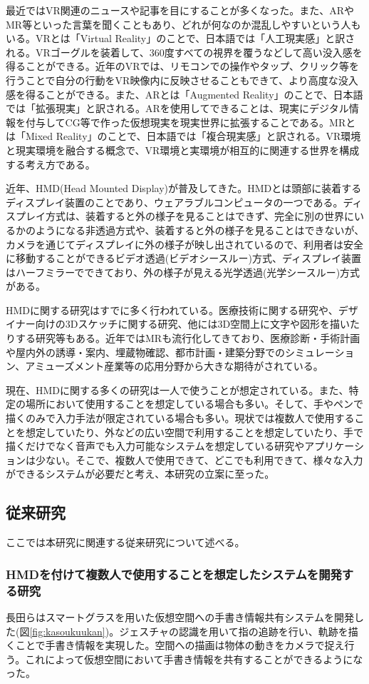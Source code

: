 \documentclass[11pt,a4j, titlepage]{jarticle} %
\begin{document}
最近ではVR関連のニュースや記事を目にすることが多くなった。また、ARやMR等といった言葉を聞くこともあり、どれが何なのか混乱しやすいという人もいる。VRとは「Virtual Reality」のことで、日本語では「人工現実感」と訳される。VRゴーグルを装着して、360度すべての視界を覆うなどして高い没入感を得ることができる。近年のVRでは、リモコンでの操作やタップ、クリック等を行うことで自分の行動をVR映像内に反映させることもできて、より高度な没入感を得ることができる。また、ARとは「Augmented Reality」のことで、日本語では「拡張現実」と訳される。ARを使用してできることは、現実にデジタル情報を付与してCG等で作った仮想現実を現実世界に拡張することである。MRとは「Mixed Reality」のことで、日本語では「複合現実感」と訳される。VR環境と現実環境を融合する概念で、VR環境と実環境が相互的に関連する世界を構成する考え方である。

近年、HMD(Head Mounted Display)が普及してきた。HMDとは頭部に装着するディスプレイ装置のことであり、ウェアラブルコンピュータの一つである。ディスプレイ方式は、装着すると外の様子を見ることはできず、完全に別の世界にいるかのようになる非透過方式や、装着すると外の様子を見ることはできないが、カメラを通じてディスプレイに外の様子が映し出されているので、利用者は安全に移動することができるビデオ透過(ビデオシースルー)方式、ディスプレイ装置はハーフミラーでできており、外の様子が見える光学透過(光学シースルー)方式がある。

HMDに関する研究はすでに多く行われている。医療技術に関する研究や、デザイナー向けの3Dスケッチに関する研究、他には3D空間上に文字や図形を描いたりする研究等もある。近年ではMRも流行化してきており、医療診断・手術計画や屋内外の誘導・案内、埋蔵物確認、都市計画・建築分野でのシミュレーション、アミューズメント産業等の応用分野から大きな期待がされている\cite{mr}。

現在、HMDに関する多くの研究は一人で使うことが想定されている。また、特定の場所において使用することを想定している場合も多い。そして、手やペンで描くのみで入力手法が限定されている場合も多い。現状では複数人で使用することを想定していたり、外などの広い空間で利用することを想定していたり、手で描くだけでなく音声でも入力可能なシステムを想定している研究やアプリケーションは少ない。そこで、複数人で使用できて、どこでも利用できて、様々な入力ができるシステムが必要だと考え、本研究の立案に至った。

\subsection{従来研究}
ここでは本研究に関連する従来研究について述べる。
\subsubsection{HMDを付けて複数人で使用することを想定したシステムを開発する研究}
長田ら\cite{nagata}はスマートグラスを用いた仮想空間への手書き情報共有システムを開発した(図\ref{fig:kasoukuukan})。ジェスチャの認識を用いて指の追跡を行い、軌跡を描くことで手書き情報を実現した。空間への描画は物体の動きをカメラで捉え行う。これによって仮想空間において手書き情報を共有することができるようになった。
\end{document}
